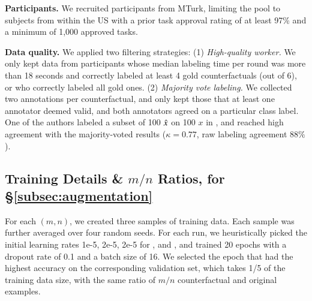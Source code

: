 \textbf{Participants.}
We recruited participants from MTurk, limiting the pool to subjects from within the US with a prior task approval rating of at least 97\% and a minimum of 1,000 approved tasks.

\textbf{Data quality.}
We applied two filtering strategies: 
(1) \emph{High-quality worker.} 
We only kept data from participants whose median labeling time per round was more than 18 seconds and correctly labeled at least 4 gold counterfactuals (out of 6), or who correctly labeled all gold ones.
(2) \emph{Majority vote labeling.}
We collected two annotations per counterfactual, and only kept those that at least one annotator deemed valid, and both annotators agreed on a particular class label.
One of the authors labeled a subset of 100 $\hat{x}$ on 100 $x$ in \sst, and reached high agreement with the majority-voted results ($\kappa=0.77$, raw labeling agreement $88\%$).




\subsection{Training Details \& $m/n$ Ratios, for \S\ref{subsec:augmentation}}
\label{appendix:data_collection}

For each $(m,n)$, we created three samples of training data.
Each sample was further averaged over four random seeds.
For each run, we heuristically picked the initial learning rates 1e-5, 2e-5, 2e-5 for \sst, \nli and \qqp, and trained 20 epochs with a dropout rate of 0.1 and a batch size of 16. 
We selected the epoch that had the highest accuracy on the corresponding validation set, which takes 1/5 of the training data size, with the same ratio of $m/n$ counterfactual and original examples.


